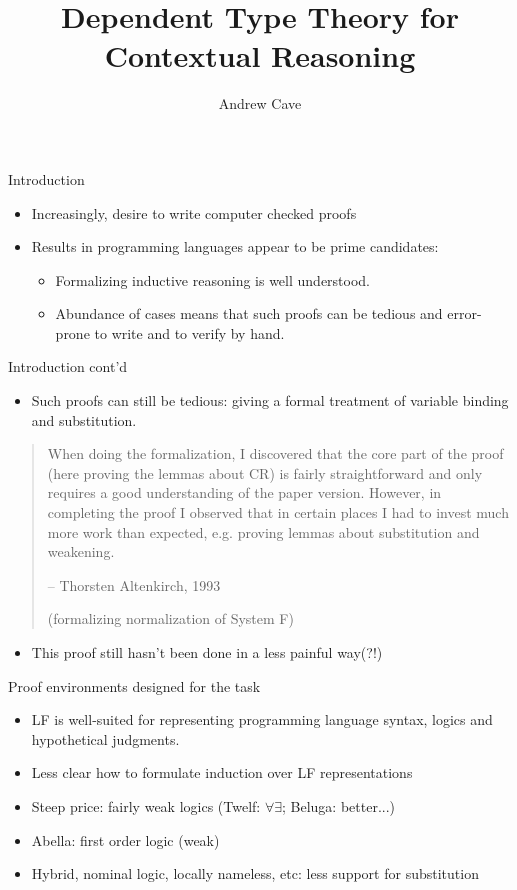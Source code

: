 \documentclass[usenames,dvipsnames]{beamer}
\author{Andrew Cave}
\title[{\makebox[.45\paperwidth]{Dependent Type Theory for Contextual Reasoning\hfill%
       \insertframenumber/\inserttotalframenumber}}]{Dependent Type Theory for Contextual Reasoning}
\begin{document}
\begin{frame}
\titlepage
\end{frame}

\begin{frame}{Introduction}
\begin{itemize}
\item Increasingly, desire to write computer checked proofs
\item Results in programming languages appear to be prime
candidates:
\begin{itemize}
\item Formalizing inductive reasoning is well understood.
\item Abundance of cases means that such proofs can be
tedious and error-prone to write and to verify by hand.
\end{itemize}
\end{itemize}
\end{frame}

\begin{frame}{Introduction cont'd}
\begin{itemize}
\item Such proofs can still be tedious: giving a formal treatment of variable binding and
substitution.
\end{itemize}
\begin{quote}
When doing the formalization, I discovered that the core part of the
proof (here proving the lemmas about CR) is fairly straightforward and
only requires a good understanding of the paper version. However, in
completing the proof I observed that in certain places I had to invest
much more work than expected, e.g. proving lemmas about substitution
and weakening.

-- Thorsten Altenkirch, 1993

   (formalizing normalization of System F)
\end{quote}
\pause
\begin{itemize}
\item This proof still hasn't been done in a less painful way(?!)
\end{itemize}
\end{frame}

\begin{frame}{Proof environments designed for the task}
\begin{itemize}
\item LF is well-suited for representing
programming language syntax, logics and hypothetical
judgments.
\item Less clear how to formulate induction
over LF representations
\item Steep price: fairly weak logics (Twelf: $\forall\exists$; Beluga: better...)
\item Abella: first order logic (weak)
\item Hybrid, nominal logic, locally nameless, etc: less support for substitution
\end{itemize}
\end{frame}
\end{document}
